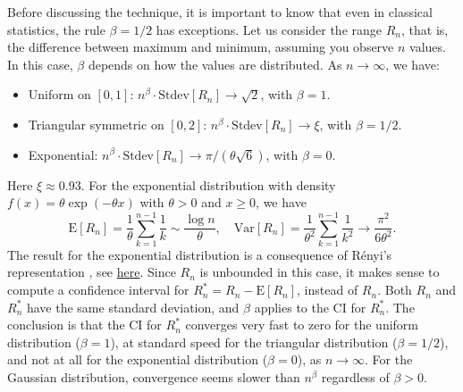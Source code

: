 \documentclass[oneside,10pt]{book}
\begin{document}
Before discussing the technique, it is important to know that even in classical statistics, the rule $\beta=1/2$ has exceptions.
Let us consider the range $R_n$, that is, the difference between maximum and
 minimum, assuming you observe $n$ values. In this case, $\beta$ depends on how the values are distributed. As
$n\rightarrow \infty$, we have: \vspace{1ex}
\begin{itemize}
\item Uniform on $[0, 1]$: $n^\beta \cdot \text{Stdev}[R_n] \rightarrow \sqrt{2}$, with $\beta = 1$.
\item Triangular symmetric on $[0, 2]$: $n^\beta\cdot\text{Stdev}[R_n] \rightarrow \xi$, with $\beta = 1/2$.
\item Exponential: $n^\beta\cdot\text{Stdev}[R_n]\rightarrow \pi/(\theta\sqrt{6})$, with $\beta = 0$.
\end{itemize}\vspace{1ex}
Here $\xi\approx 0.93$. For the exponential distribution with density $f(x) = \theta \exp(-\theta x)$ with $\theta>0$ and $x\geq 0$, we have
$$ \text{E}[R_n] =  \frac{1}{\theta}\sum_{k=1}^{n-1}\frac{1}{k} \sim \frac{\log n}{\theta},
 \quad \text{Var}[R_n] = \frac{1}{\theta^2}\sum_{k=1}^{n-1}\frac{1}{k^2} \rightarrow \frac{\pi^2}{6\theta^2}.
$$
The result for the exponential distribution is a consequence of
\textcolor{index}{Rényi's representation} \cite{renini53}, see \href{https://math.stackexchange.com/questions/3231505/variance-of-the-range-for-the-exponential-distribution}{here}.
Since $R_n$ is unbounded in this case, it makes sense
 to compute a confidence interval for $R^*_n = R_n - \text{E}[R_n]$, instead of $R_n$. Both $R_n$ and $R^*_n$ have the same standard deviation, and $\beta$
applies to the CI for $R^*_n$. The conclusion is that the CI for $R^*_n$ converges very fast to zero for the uniform distribution ($\beta=1$), at standard speed for the triangular distribution ($\beta=1/2$), and not at all for the exponential distribution ($\beta=0$), as $n\rightarrow\infty$. For the Gaussian distribution, convergence seems slower than $n^\beta$ regardless of $\beta>0$.
\end{document}
